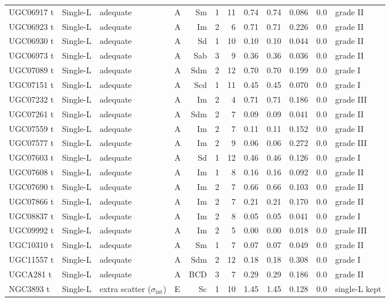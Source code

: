\documentclass[10pt]{article}
\begin{document}
\begin{landscape}
{\begin{longtable}{llllrrrrrrrl}
UGC06917 t & Single-L & adequate & A & Sm & 1 & 11 & 0.74 & 0.74 & 0.086 & 0.0 & grade II\\
UGC06923 t & Single-L & adequate & A & Im & 2 & 6 & 0.71 & 0.71 & 0.226 & 0.0 & grade II\\
UGC06930 t & Single-L & adequate & A & Sd & 1 & 10 & 0.10 & 0.10 & 0.044 & 0.0 & grade II\\
UGC06973 t & Single-L & adequate & A & Sab & 3 & 9 & 0.36 & 0.36 & 0.036 & 0.0 & grade II\\
UGC07089 t & Single-L & adequate & A & Sdm & 2 & 12 & 0.70 & 0.70 & 0.199 & 0.0 & grade I\\
UGC07151 t & Single-L & adequate & A & Scd & 1 & 11 & 0.45 & 0.45 & 0.070 & 0.0 & grade I\\
UGC07232 t & Single-L & adequate & A & Im & 2 & 4 & 0.71 & 0.71 & 0.186 & 0.0 & grade III\\
UGC07261 t & Single-L & adequate & A & Sdm & 2 & 7 & 0.09 & 0.09 & 0.041 & 0.0 & grade II\\
UGC07559 t & Single-L & adequate & A & Im & 2 & 7 & 0.11 & 0.11 & 0.152 & 0.0 & grade II\\
UGC07577 t & Single-L & adequate & A & Im & 2 & 9 & 0.06 & 0.06 & 0.272 & 0.0 & grade III\\
UGC07603 t & Single-L & adequate & A & Sd & 1 & 12 & 0.46 & 0.46 & 0.126 & 0.0 & grade I\\
UGC07608 t & Single-L & adequate & A & Im & 1 & 8 & 0.16 & 0.16 & 0.092 & 0.0 & grade II\\
UGC07690 t & Single-L & adequate & A & Im & 2 & 7 & 0.66 & 0.66 & 0.103 & 0.0 & grade II\\
UGC07866 t & Single-L & adequate & A & Im & 2 & 7 & 0.21 & 0.21 & 0.170 & 0.0 & grade II\\
UGC08837 t & Single-L & adequate & A & Im & 2 & 8 & 0.05 & 0.05 & 0.041 & 0.0 & grade I\\
UGC09992 t & Single-L & adequate & A & Im & 2 & 5 & 0.00 & 0.00 & 0.018 & 0.0 & grade III\\
UGC10310 t & Single-L & adequate & A & Sm & 1 & 7 & 0.07 & 0.07 & 0.049 & 0.0 & grade II\\
UGC11557 t & Single-L & adequate & A & Sdm & 2 & 12 & 0.18 & 0.18 & 0.308 & 0.0 & grade I\\
UGCA281 t & Single-L & adequate & A & BCD & 3 & 7 & 0.29 & 0.29 & 0.186 & 0.0 & grade II\\
NGC3893 t & Single-L & extra scatter ($\sigma_\mathrm{int}$) & E & Sc & 1 & 10 & 1.45 & 1.45 & 0.128 & 0.0 & single-L kept\\

\end{longtable}}
\end{landscape}
\end{document}
